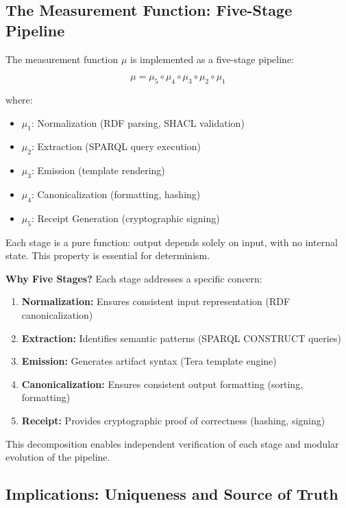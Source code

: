 \subsection{The Measurement Function: Five-Stage Pipeline}

The measurement function \(\mu\) is implemented as a five-stage pipeline:

\begin{equation}
    \mu = \mu_5 \circ \mu_4 \circ \mu_3 \circ \mu_2 \circ \mu_1
\end{equation}

where:
\begin{itemize}
    \item \(\mu_1\): Normalization (RDF parsing, SHACL validation)
    \item \(\mu_2\): Extraction (SPARQL query execution)
    \item \(\mu_3\): Emission (template rendering)
    \item \(\mu_4\): Canonicalization (formatting, hashing)
    \item \(\mu_5\): Receipt Generation (cryptographic signing)
\end{itemize}

Each stage is a pure function: output depends solely on input, with no internal state. This property is essential for determinism.

\textbf{Why Five Stages?} Each stage addresses a specific concern:
\begin{enumerate}
    \item \textbf{Normalization:} Ensures consistent input representation (RDF canonicalization)
    \item \textbf{Extraction:} Identifies semantic patterns (SPARQL CONSTRUCT queries)
    \item \textbf{Emission:} Generates artifact syntax (Tera template engine)
    \item \textbf{Canonicalization:} Ensures consistent output formatting (sorting, formatting)
    \item \textbf{Receipt:} Provides cryptographic proof of correctness (hashing, signing)
\end{enumerate}

This decomposition enables independent verification of each stage and modular evolution of the pipeline.

\subsection{Implications: Uniqueness and Source of Truth}

